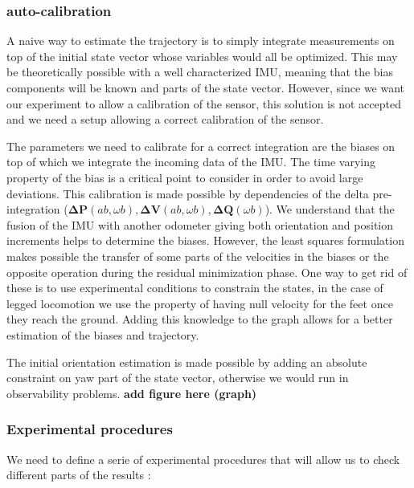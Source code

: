 \subsubsection{auto-calibration}
A naive way to estimate the trajectory is to simply integrate measurements on top of the initial state vector whose variables would all be optimized. 
This may be theoretically possible with a well characterized IMU, meaning that the bias components will be known and parts of the state vector.
However, since we want our experiment to allow a calibration of the sensor, this solution is not accepted and we need a setup allowing a correct calibration of the sensor.

The parameters we need to calibrate for a correct integration are the biases on top of which we integrate the incoming data of the IMU.
The time varying property of the bias is a critical point to consider in order to avoid large deviations. This calibration is made possible
by dependencies of the delta pre-integration ($\boldsymbol{\Delta P}(ab, \omega b), \boldsymbol{\Delta V}(ab, \omega b), \boldsymbol{\Delta Q}(\omega b)$). We understand that the fusion of the IMU with another odometer giving both
orientation and position increments helps to determine the biases. However, the least squares formulation makes possible the transfer of some parts
of the velocities in the biases or the opposite operation during the residual minimization phase. One way to get rid of these is to use experimental conditions to constrain the states, in the case of legged
locomotion we use the property of having null velocity for the feet once they reach the ground. Adding this knowledge to the graph allows for a
better estimation of the biases and trajectory.

The initial orientation estimation is made possible by adding an absolute constraint on yaw part of the state vector, otherwise we would run in observability problems. \textbf{add figure here (graph)}

\subsubsection{Experimental procedures}

We need to define a serie of experimental procedures that will allow us to check different parts of the results :


